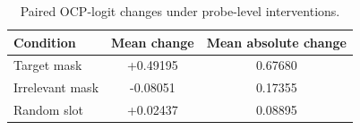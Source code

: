 \begin{table}[t]
\centering
\caption{Paired OCP-logit changes under probe-level interventions.}
\label{tab:physion-logit-intervention}
\scriptsize
\renewcommand{\arraystretch}{1.03}
\begin{tabularx}{0.70\linewidth}{@{}Lcc@{}}
\toprule\toprule
\textbf{Condition} & \textbf{Mean change} & \textbf{Mean absolute change} \\
\midrule
Target mask & +0.49195 & 0.67680 \\
Irrelevant mask & -0.08051 & 0.17355 \\
Random slot & +0.02437 & 0.08895 \\
\bottomrule\bottomrule
\end{tabularx}
\end{table}
